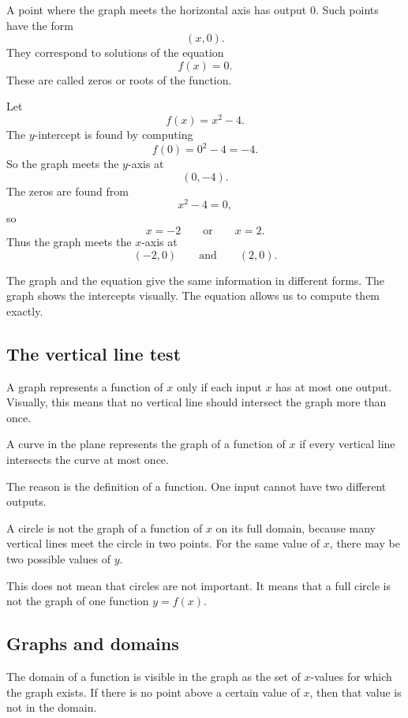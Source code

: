 A point where the graph meets the horizontal axis has output \(0\). Such points have the form
\[
(x,0).
\]
They correspond to solutions of the equation
\[
f(x)=0.
\]
These are called zeros or roots of the function.

\begin{examplebox}
Let
\[
f(x)=x^2-4.
\]
The \(y\)-intercept is found by computing
\[
f(0)=0^2-4=-4.
\]
So the graph meets the \(y\)-axis at
\[
(0,-4).
\]
The zeros are found from
\[
x^2-4=0,
\]
so
\[
x=-2
\qquad\text{or}\qquad
x=2.
\]
Thus the graph meets the \(x\)-axis at
\[
(-2,0)
\qquad\text{and}\qquad
(2,0).
\]
\end{examplebox}

The graph and the equation give the same information in different forms. The graph shows the intercepts visually. The equation allows us to compute them exactly.

\subsection*{The vertical line test}

A graph represents a function of \(x\) only if each input \(x\) has at most one output. Visually, this means that no vertical line should intersect the graph more than once.

\begin{theorembox}
A curve in the plane represents the graph of a function of \(x\) if every vertical line intersects the curve at most once.
\end{theorembox}

The reason is the definition of a function. One input cannot have two different outputs.

\begin{examplebox}
A circle is not the graph of a function of \(x\) on its full domain, because many vertical lines meet the circle in two points. For the same value of \(x\), there may be two possible values of \(y\).

This does not mean that circles are not important. It means that a full circle is not the graph of one function \(y=f(x)\).
\end{examplebox}

\subsection*{Graphs and domains}

The domain of a function is visible in the graph as the set of \(x\)-values for which the graph exists. If there is no point above a certain value of \(x\), then that value is not in the domain.

